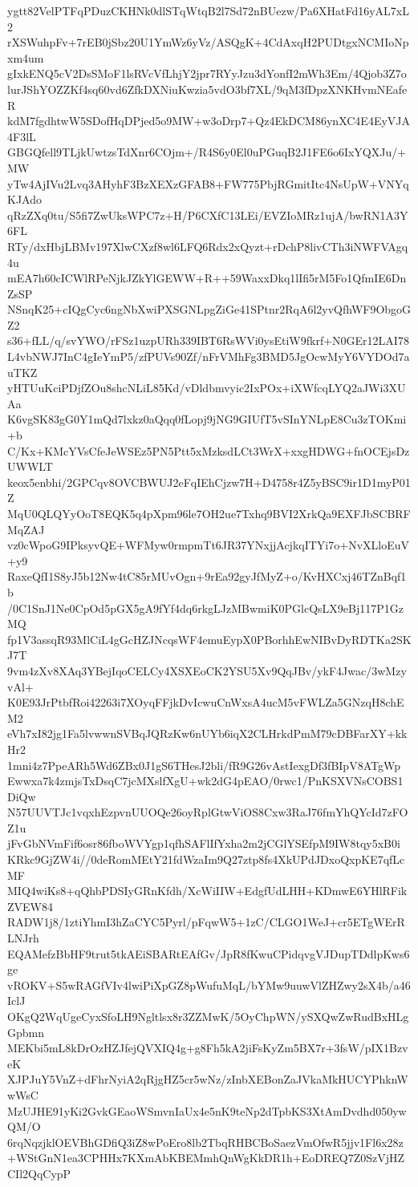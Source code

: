 ygtt82VelPTFqPDuzCKHNk0dlSTqWtqB2l7Sd72nBUezw/Pa6XHatFd16yAL7xL2
rXSWuhpFv+7rEB0jSbz20U1YmWz6yVz/ASQgK+4CdAxqH2PUDtgxNCMIoNpxm4um
gIxkENQ5cV2DsSMoF1lsRVcVfLhjY2jpr7RYyJzu3dYonfI2mWh3Em/4Qjob3Z7o
lurJShYOZZKf4sq60vd6ZfkDXNiuKwzia5vdO3bf7XL/9qM3fDpzXNKHvmNEafeR
kdM7fgdhtwW5SDofHqDPjed5o9MW+w3oDrp7+Qz4EkDCM86ynXC4E4EyVJA4F3lL
GBGQfell9TLjkUwtzsTdXnr6COjm+/R4S6y0El0uPGuqB2J1FE6o6IxYQXJu/+MW
yTw4AjIVu2Lvq3AHyhF3BzXEXzGFAB8+FW775PbjRGmitItc4NsUpW+VNYqKJAdo
qRzZXq0tu/S5fi7ZwUksWPC7z+H/P6CXfC13LEi/EVZIoMRz1ujA/bwRN1A3Y6FL
RTy/dxHbjLBMv197XlwCXzf8wl6LFQ6Rdx2xQyzt+rDchP8livCTh3iNWFVAgq4u
mEA7h60cICWlRPeNjkJZkYlGEWW+R++59WaxxDkq1lIfi5rM5Fo1QfmIE6DnZsSP
NSnqK25+cIQgCyc6ngNbXwiPXSGNLpgZiGe41SPtnr2RqA6l2yvQfhWF9ObgoGZ2
s36+fLL/q/svYWO/rFSz1uzpURh339IBT6RsWVi0ysEtiW9fkrf+N0GEr12LAI78
L4vbNWJ7InC4gIeYmP5/zfPUVs90Zf/nFrVMhFg3BMD5JgOcwMyY6VYDOd7auTKZ
yHTUuKciPDjfZOu8shcNLiL85Kd/vDldbmvyic2IxPOx+iXWfcqLYQ2aJWi3XUAa
K6vgSK83gG0Y1mQd7lxkz0aQqq0fLopj9jNG9GIUfT5vSInYNLpE8Cu3zTOKmi+b
C/Kx+KMcYVsCfeJeWSEz5PN5Ptt5xMzksdLCt3WrX+xxgHDWG+fnOCEjsDzUWWLT
keox5enbhi/2GPCqv8OVCBWUJ2eFqIEhCjzw7H+D4758r4Z5yBSC9ir1D1myP01Z
MqU0QLQYyOoT8EQK5q4pXpm96le7OH2ue7Txhq9BVI2XrkQa9EXFJbSCBRFMqZAJ
vz0cWpoG9IPksyvQE+WFMyw0rmpmTt6JR37YNxjjAcjkqITYi7o+NvXLloEuV+y9
RaxeQfI1S8yJ5b12Nw4tC85rMUvOgn+9rEa92gyJfMyZ+o/KvHXCxj46TZnBqf1b
/0C1SnJ1Ne0CpOd5pGX5gA9fYf4dq6rkgLJzMBwmiK0PGlcQsLX9eBj117P1GzMQ
fp1V3assqR93MlCiL4gGcHZJNcqsWF4emuEypX0PBorhhEwNIBvDyRDTKa2SKJ7T
9vm4zXv8XAq3YBejIqoCELCy4XSXEoCK2YSU5Xv9QqJBv/ykF4Jwac/3wMzyvAl+
K0E93JrPtbfRoi42263i7XOyqFFjkDvIcwuCnWxsA4ucM5vFWLZa5GNzqH8chEM2
eVh7xI82jg1Fa5lvwwnSVBqJQRzKw6nUYb6iqX2CLHrkdPmM79cDBFarXY+kkHr2
1mni4z7PpeARh5Wd6ZBx0J1gS6THesJ2bli/fR9G26vAstIexgDf3fBIpV8ATgWp
Ewwxa7k4zmjsTxDsqC7jcMXslfXgU+wk2dG4pEAO/0rwc1/PnKSXVNsCOBS1DiQw
N57UUVTJc1vqxhEzpvnUUOQe26oyRplGtwViOS8Cxw3RaJ76fmYhQYcId7zFOZ1u
jFvGbNVmFif6osr86fboWVYgp1qfhSAFlIfYxha2m2jCGlYSEfpM9IW8tqy5xB0i
KRkc9GjZW4i//0deRomMEtY21fdWzaIm9Q27ztp8fs4XkUPdJDxoQxpKE7qfLcMF
MIQ4wiKs8+qQhbPDSIyGRnKfdh/XcWiIIW+EdgfUdLHH+KDmwE6YHlRFikZVEW84
RADW1j8/1ztiYhmI3hZaCYC5Pyrl/pFqwW5+1zC/CLGO1WeJ+cr5ETgWErRLNJrh
EQAMefzBbHF9trut5tkAEiSBARtEAfGv/JpR8fKwuCPidqvgVJDupTDdlpKws6ge
vROKV+S5wRAGfVIv4lwiPiXpGZ8pWufuMqL/bYMw9uuwVlZHZwy2sX4b/a46IclJ
OKgQ2WqUgeCyxSfoLH9Ngltlsx8r3ZZMwK/5OyChpWN/ySXQwZwRudBxHLgGpbmn
MEKbi5mL8kDrOzHZJfejQVXIQ4g+g8Fh5kA2jiFsKyZm5BX7r+3fsW/pIX1BzveK
XJPJuY5VnZ+dFhrNyiA2qRjgHZ5cr5wNz/zInbXEBonZaJVkaMkHUCYPhknWwWsC
MzUJHE91yKi2GvkGEaoWSmvnIaUx4e5nK9teNp2dTpbKS3XtAmDvdhd050ywQM/O
6rqNqzjklOEVBhGDfiQ3iZ8wPoEro8lb2TbqRHBCBoSaezVmOfwR5jjv1Fl6x28z
+WStGnN1ea3CPHHx7KXmAbKBEMmhQnWgKkDR1h+EoDREQ7Z0SzVjHZCIl2QqCypP
